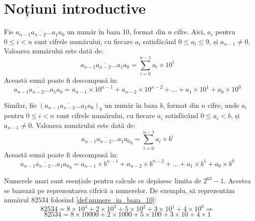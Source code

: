 

\section{Noțiuni introductive}

\begin{definition}\label{def:numere_in_baza_10}
Fie $\overline{a_{n-1} a_{n-2} \ldots a_1 a_0}$ un număr în baza 10, format din $n$ cifre. Aici, \( a_i \) pentru \( 0 \leq i < n \) sunt cifrele numărului, cu fiecare \( a_i \) satisfăcând \( 0 \leq a_i \leq 9 \), și \( a_{n-1} \neq 0 \). Valoarea numărului este dată de:
\begin{equation*}
    \overline{a_{n-1} a_{n-2} \ldots a_1 a_0} = \sum_{i=0}^{n-1} a_i \times 10^i
\end{equation*}
Această sumă poate fi descompusă în:
\begin{equation*}
    \overline{a_{n-1} a_{n-2} \ldots a_1 a_0} = a_{n-1} \times 10^{n-1} + a_{n-2} \times 10^{n-2} + \ldots + a_1 \times 10^1 + a_0 \times 10^0
\end{equation*}
\end{definition}

\begin{observation}\label{obs:numere_in_baze}
Similar, fie \( (\overline{a_{n-1} a_{n-2} \ldots a_1 a_0})_b \) un număr în baza \( b \), format din \( n \) cifre, unde \( a_i \) pentru \( 0 \leq i < n \) sunt cifrele numărului, cu fiecare \( a_i \) satisfăcând \( 0 \leq a_i < b \), și \( a_{n-1} \neq 0 \). Valoarea numărului este dată de:
\[
\overline{a_{n-1} a_{n-2} \ldots a_1 a_0}_b = \sum_{i=0}^{n-1} a_i \times b^i
\]
Această sumă poate fi descompusă în:
\[
\overline{a_{n-1} a_{n-2} \ldots a_1 a_0}_b = a_{n-1} \times b^{n-1} + a_{n-2} \times b^{n-2} + \ldots + a_1 \times b^1 + a_0 \times b^0
\]
\end{observation}


Numerele mari sunt esențiale pentru calcule ce depășesc limita de $2^{63} - 1$. Acestea se bazează pe reprezentarea cifrică a numerelor. De exemplu, să reprezentăm numărul $82534$ folosind \cref{def:numere_in_baza_10}:
\[
82534 = 8 \times 10^{4} + 2 \times 10^3 + 5 \times 10^2 + 3 \times 10^1 + 4 \times 10^0 \Rightarrow
\]
\[
82534 = 8 \times 10000 + 2 \times 1000 + 5 \times 100 + 3 \times 10 + 4 \times 1
\]

